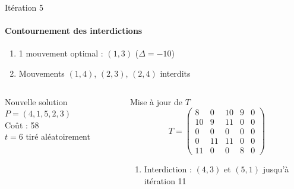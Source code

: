 \documentclass[10pt, handout]{beamer}
\begin{document}
\begin{frame}{Itération 5}
    \framesubtitle{Contournement des interdictions}


    \begin{enumerate}
        \item 1 mouvement optimal : \( (1,3) \) (\( \Delta = -10 \))
        \item Mouvements \( (1,4) \), \( (2,3) \), \( (2,4) \) interdits
    \end{enumerate}

    \begin{columns}
        \begin{alertblock}{Nouvelle solution}
            \( P = (4, 1, 5, 2, 3) \) \\
            Coût : 58 \\
            \( t = 6 \) tiré aléatoirement
        \end{alertblock}

        \begin{exampleblock}{Mise à jour de \( T \)}
            \[
                T = \begin{pmatrix}
                    8  & 0  & 10 & 9 & 0 \\
                    10 & 9  & 11 & 0 & 0 \\
                    0  & 0  & 0  & 0 & 0 \\
                    0  & 11 & 11 & 0 & 0 \\
                    11 & 0  & 0  & 8 & 0
                \end{pmatrix}
            \]
            \begin{enumerate}
                \item Interdiction : \( (4,3) \) et \( (5,1) \) jusqu'à itération 11
            \end{enumerate}
        \end{exampleblock}
    \end{columns}
\end{frame}
\end{document}
